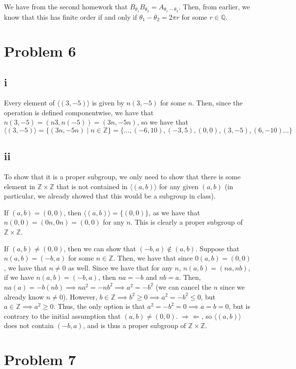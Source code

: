 \documentclass[12pt,letterpaper]{article}
\theoremstyle{definition}
\newcommand{\contra}{\Rightarrow\!\Leftarrow}
\newcommand{\Z}{\mathbb{Z}}
\newcommand{\Q}{\mathbb{Q}}
\begin{document}
We have from the second homework that $B_{\theta_{1}}B_{\theta_{2}} = A_{\theta_{1}-\theta_{2}}$. Then, from earlier, we know that this has finite order if and only if $\theta_{1} - \theta_{2} = 2\pi r$ for some $r \in \Q$.

\section*{Problem 6}
\subsection*{i}

Every element of $\langle (3,-5) \rangle$ is given by $n(3, -5)$ for some $n$. Then, since the operation is defined componentwise, we have that $n(3,-5) = (n3, n(-5)) = (3n, -5n)$, so we have that
\[
   \langle (3,-5) \rangle = \{(3n, -5n) \mid n \in \Z\} = \{\dots,(-6, 10), (-3,5), (0, 0), (3, -5), (6, -10)\dots\}
\]

\subsection*{ii}

To show that it is a proper subgroup, we only need to show that there is some element in $\Z \times \Z$ that is not contained in $\langle (a,b) \rangle$ for any given $(a,b)$ (in particular, we already showed that this would be a subgroup in class).

If $(a,b) = (0,0)$, then $\langle (a,b) \rangle = \{(0, 0)\}$, as we have that $n(0,0) = (0n, 0n) = (0, 0)$ for any $n$. This is clearly a proper subgroup of $\Z \times \Z$.

If $(a,b) \neq (0, 0)$, then we can show that $(-b,a) \notin (a,b)$. Suppose that $n(a,b) = (-b, a)$ for some $n \in \Z$. Then, we have that since $0(a,b) = (0, 0)$, we have that $n \neq 0$ as well. Since we have that for any $n$, $n(a,b) = (na, nb)$, if we have $n(a,b) = (-b,a)$, then $na = -b$ and $nb = a$. Then, $na(a) = -b(nb) \implies na^{2} = -nb^{2} \implies a^{2} = -b^{2}$ (we can cancel the $n$ since we already know $n \neq 0$). However, $b \in \Z \implies b^{2} \geq 0 \implies a^{2} = -b^{2} \leq 0$, but $a \in \Z \implies a^{2} \geq 0$. Thus, the only option is that $a^{2} = -b^{2} = 0 \implies a = b =0$, but is contrary to the initial assumption that $(a,b) \neq (0,0)$. $\contra$, so $\langle(a,b)\rangle$ does not contain $(-b, a)$, and is thus a proper subgroup of $\Z \times \Z$.

\section*{Problem 7}
\end{document}
